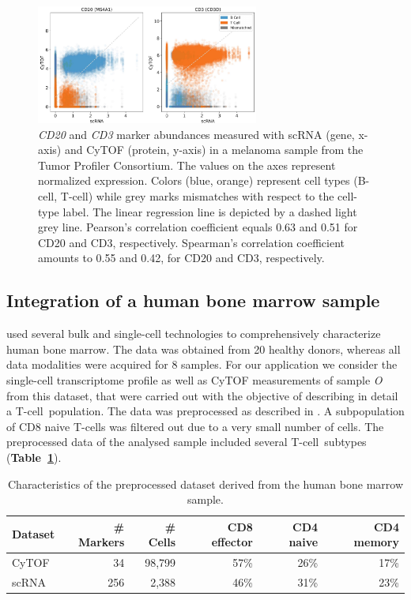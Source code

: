 \begin{figure}[htbp]
    \centering
    \includegraphics[width=0.65\textwidth]{figures/integration/gene_protein_correlation_unicapacity}
    \caption{
      \textit{CD20} and \textit{CD3} marker abundances measured with scRNA (gene, x-axis) and CyTOF (protein, y-axis) in a melanoma sample from the Tumor Profiler Consortium.
      The values on the axes represent normalized expression.
      Colors (blue, orange) represent cell types (B-cell, T-cell) while grey marks mismatches with respect to the cell-type label.
      The linear regression line is depicted by a dashed light grey line.
      Pearson's correlation coefficient equals 0.63 and 0.51 for CD20 and CD3, respectively.
      Spearman's correlation coefficient amounts to 0.55 and 0.42, for CD20 and CD3, respectively.
    }
    \label{fig:tupro-marker-correlation-uni}
\end{figure}


\subsection{Integration of a human bone marrow sample}
\cite{oetjen2018} used several bulk and single-cell technologies to comprehensively characterize human bone marrow.
The data was obtained from 20 healthy donors, whereas all data modalities were acquired for 8 samples.
For our application we consider the single-cell transcriptome profile as well as CyTOF measurements of sample \textit{O} from this dataset, that were carried out with the objective of describing in detail a T-cell~population.
The data was preprocessed as described in \cite{oetjen2018}.
A subpopulation of CD8 naive T-cells was filtered out due to a very small number of cells.
The preprocessed data of the analysed sample included several T-cell~subtypes (\textbf{Table~\ref{tbl:oetjen-dataset}}).

\begin{table}[h]
    \centering
    \begin{tabular}{lrrrrr}
    \toprule
    Dataset &  \# Markers &  \# Cells &  CD8 effector &  CD4 naive & CD4 memory  \\
    \midrule
    CyTOF &         34 &   98,799 &       57\% &       26\% & 17\% \\
    scRNA &       256 &     2,388 &       46\% &       31\% & 23\% \\
    \bottomrule
    \end{tabular}
    \caption{
        Characteristics of the preprocessed dataset derived from the human bone marrow sample. 
    }
    \label{tbl:oetjen-dataset}   
\end{table}


